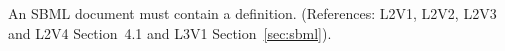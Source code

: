 An SBML document must contain a \Model definition.  (References:
L2V1, L2V2, L2V3 and L2V4 Section~4.1 and L3V1 Section~\ref{sec:sbml}).
